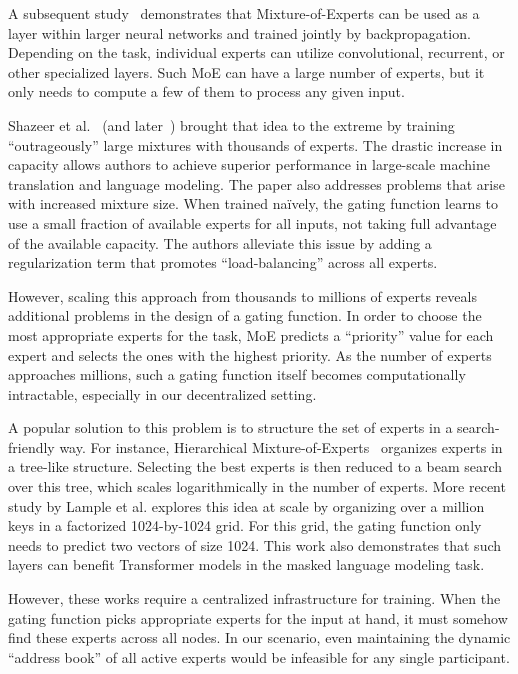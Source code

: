 A subsequent study~\cite{eigen2013learning} demonstrates that Mixture-of-Experts can be used as a layer within larger neural networks and trained jointly by backpropagation. Depending on the task, individual experts can utilize convolutional, recurrent, or other specialized layers. Such MoE can have a large number of experts, but it only needs to compute a few of them to process any given input.

Shazeer et al.~\cite{shazeer2017outrageously} (and later~\cite{Lepikhin2020GShardSG}) brought that idea to the extreme by training ``outrageously'' large mixtures with thousands of experts. The drastic increase in capacity allows authors to achieve superior performance in large-scale machine translation and language modeling. The paper also addresses problems that arise with increased mixture size. When trained na\"ively, the gating function learns to use a small fraction of available experts for all inputs, not taking full advantage of the available capacity. The authors alleviate this issue by adding a regularization term that promotes ``load-balancing'' across all experts.

However, scaling this approach from thousands to millions of experts reveals additional problems in the design of a gating function. In order to choose the most appropriate experts for the task, MoE predicts a ``priority'' value for each expert and selects the ones with the highest priority. As the number of experts approaches millions, such a gating function itself becomes computationally intractable, especially in our decentralized setting.

A popular solution to this problem is to structure the set of experts in a search-friendly way. For instance, Hierarchical Mixture-of-Experts~\cite{jordan1994hierarchical} organizes experts in a tree-like structure. Selecting the best experts is then reduced to a beam search over this tree, which scales logarithmically in the number of experts. More recent study by Lample et al. \cite{pkm} explores this idea at scale by organizing over a million keys in a factorized 1024-by-1024 grid. For this grid, the gating function only needs to predict two vectors of size 1024. This work also demonstrates that such layers can benefit Transformer models in the masked language modeling task.

However, these works require a centralized infrastructure for training. When the gating function picks appropriate experts for the input at hand, it must somehow find these experts across all nodes. In our scenario, even maintaining the dynamic ``address book'' of all active experts would be infeasible for any single participant.

